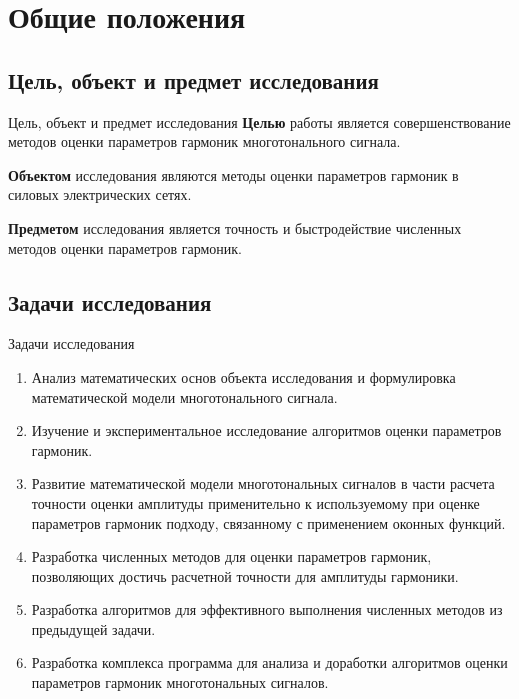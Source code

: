 \section{Общие положения}

\subsection{Цель, объект и предмет исследования}
\begin{frame}{Цель, объект и предмет исследования}
	\textbf{Целью} работы является совершенствование методов оценки параметров гармоник многотонального сигнала. \vspace{1em}

	\textbf{Объектом} исследования являются методы оценки параметров гармоник в силовых электрических сетях. \vspace{1em}
	
	\textbf{Предметом} исследования является точность и быстродействие численных методов оценки параметров гармоник.	
\end{frame}

\subsection{Задачи исследования}
\begin{frame}{Задачи исследования}
	\begin{enumerate}
		\item Анализ математических основ объекта исследования и формулировка математической модели многотонального сигнала.
		\item Изучение и экспериментальное исследование алгоритмов оценки параметров гармоник.
		\item Развитие математической модели многотональных сигналов в части расчета точности оценки амплитуды применительно к используемому при оценке параметров гармоник подходу, связанному с применением оконных функций.
		\item Разработка численных методов для оценки параметров гармоник, позволяющих достичь расчетной точности для амплитуды гармоники.
		\item Разработка алгоритмов для эффективного выполнения численных методов из предыдущей задачи.
		\item Разработка комплекса программа для анализа и доработки алгоритмов оценки параметров гармоник многотональных сигналов.
	\end{enumerate}
\end{frame}

